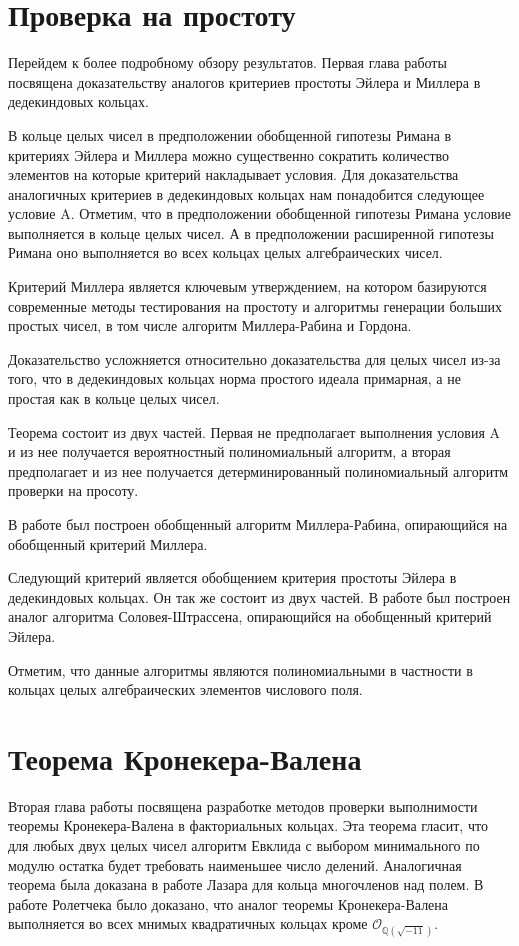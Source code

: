 \documentclass[a4paper,12pt]{article} %
\begin{document}
\section{Проверка на простоту}

Перейдем к более подробному обзору результатов.
Первая глава работы посвящена доказательству аналогов критериев простоты Эйлера и Миллера в дедекиндовых кольцах.

В кольце целых чисел в предположении обобщенной гипотезы Римана в критериях Эйлера и Миллера можно существенно сократить количество элементов на которые критерий накладывает условия.
Для доказательства аналогичных критериев в дедекиндовых кольцах нам понадобится следующее условие A.
Отметим, что в предположении обобщенной гипотезы Римана условие выполняется в кольце целых чисел.
А в предположении расширенной гипотезы Римана оно выполняется во всех кольцах целых алгебраических чисел.

Критерий Миллера является ключевым утверждением, на котором базируются современные методы тестирования на простоту и алгоритмы генерации больших простых чисел, в том числе алгоритм Миллера-Рабина и Гордона.

Доказательство усложняется относительно доказательства для целых чисел из-за того, что в дедекиндовых кольцах норма простого идеала примарная, а не простая как в кольце целых чисел.

Теорема состоит из двух частей.
Первая не предполагает выполнения условия A и из нее получается вероятностный полиномиальный алгоритм, а вторая предполагает и из нее получается детерминированный полиномиальный алгоритм проверки на просоту.

В работе был построен обобщенный алгоритм Миллера-Рабина, опирающийся на обобщенный критерий Миллера.

Следующий критерий является обобщением критерия простоты Эйлера в дедекиндовых кольцах.
Он так же состоит из двух частей.
В работе был построен аналог алгоритма Соловея-Штрассена, опирающийся на обобщенный критерий Эйлера.

Отметим, что данные алгоритмы являются полиномиальными в частности в кольцах целых алгебраических элементов числового поля.

\section{Теорема Кронекера-Валена}

Вторая глава работы посвящена разработке методов проверки выполнимости теоремы Кронекера-Валена в факториальных кольцах.
Эта теорема гласит, что для любых двух целых чисел алгоритм Евклида с выбором минимального по модулю остатка будет требовать наименьшее число делений.
Аналогичная теорема была доказана в работе Лазара для кольца многочленов над полем.
В работе Ролетчека было доказано, что аналог теоремы Кронекера-Валена выполняется во всех мнимых квадратичных кольцах кроме $\mathcal{O}_{\mathbb{Q}(\sqrt{-11})}$.
    
\end{document}
